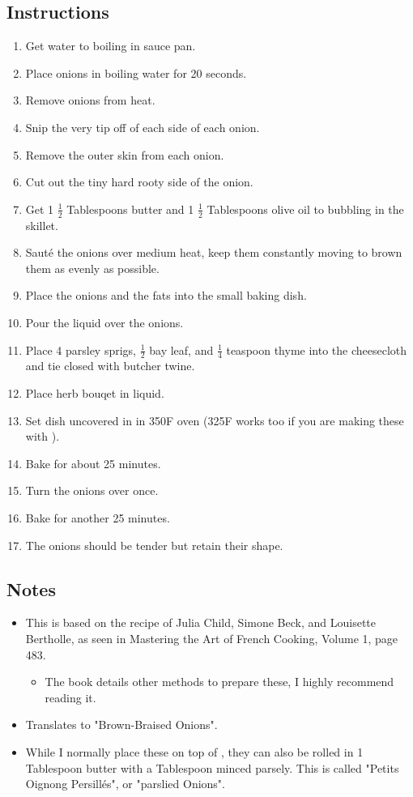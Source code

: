 \begin{multicols}{2}
\subsection*{Instructions}
\begin{enumerate}
    \item Get water to boiling in sauce pan.
    \item Place onions in boiling water for 20 seconds.
    \item Remove onions from heat.
    \item Snip the very tip off of each side of each onion.
    \item Remove the outer skin from each onion.
    \item Cut out the tiny hard rooty side of the onion.
    \item Get 1 \( \frac{1}{2} \) Tablespoons butter and 1 \( \frac{1}{2} \) Tablespoons olive oil to bubbling in the skillet.
    \item Sauté the onions over medium heat, keep them constantly moving to brown them as evenly as possible.
    \item Place the onions and the fats into the small baking dish.
    \item Pour the liquid over the onions.
    \item Place 4 parsley sprigs, \( \frac{1}{2} \) bay leaf, and \( \frac{1}{4} \) teaspoon thyme into the cheesecloth and tie closed with butcher twine.
    \item Place herb bouqet in liquid.
    \item Set dish uncovered in in 350F oven (325F works too if you are making these with ).
    \item Bake for about 25 minutes.
    \item Turn the onions over once.
    \item Bake for another 25 minutes.
    \item The onions should be tender but retain their shape.

\end{enumerate}

\subsection*{Notes}
\begin{itemize}
    \item This is based on the recipe of Julia Child, Simone Beck, and Louisette Bertholle, as seen in Mastering the Art of French Cooking, Volume 1, page 483.
    \begin{itemize}
        \item The book details other methods to prepare these, I highly recommend reading it.
    \end{itemize}
    \item Translates to "Brown-Braised Onions".
    \item While I normally place these on top of , they can also be rolled in 1 Tablespoon butter with a Tablespoon minced parsely. This is called "Petits Oignong Persillés", or "parslied Onions".
\end{itemize}
\end{multicols}
\clearpage